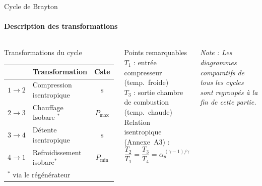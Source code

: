 \documentclass[aspectratio=43, 10pt]{beamer}
\newcommand{\Pmin}{P_{\min}}
\newcommand{\Pmax}{P_{\max}}
\begin{document}
\begin{frame}{Cycle de Brayton }
  \framesubtitle{Description des transformations}

  \begin{columns}[T,onlytextwidth]
      \begin{block}{Transformations du cycle}
        \small
        \renewcommand{\arraystretch}{1.2}
        \begin{tabular}{clc}
          \toprule
          & Transformation & Cste \\
          \midrule
          $1\!\to\!2$ & Compression isentropique      & $\text{s} $\\
          $2\!\to\!3$ & Chauffage Isobare $^*$ & $\Pmax$ \\
          $3\!\to\!4$ & D\'etente isentropique        & $\text{s} $\\
          $4\!\to\!1$ & Refroidissement isobare$^*$ & $\Pmin$ \\
          \bottomrule
          \multicolumn{3}{l}{\tiny $^*$ via le r\'eg\'en\'erateur}
        \end{tabular}
      \end{block}

      \begin{exampleblock}{Points remarquables}
        \small
        $T_1$ : entr\'ee compresseur (temp.\ froide)\\[6pt]
        $T_3$ : sortie chambre de combustion (temp.\ chaude)\\[6pt]
        Relation isentropique (Annexe~A3) :\\[4pt]
        \[
          \frac{T_2}{T_1} = \frac{T_3}{T_4}
          = \alpha_p^{\,(\gamma-1)/\gamma}
        \]
      \end{exampleblock}
      \begin{block}{}
         \small
         \textit{Note : Les diagrammes comparatifs de tous les cycles sont regroup\'es \`a la fin de cette partie.}
      \end{block}
  \end{columns}

\end{frame}
\end{document}
